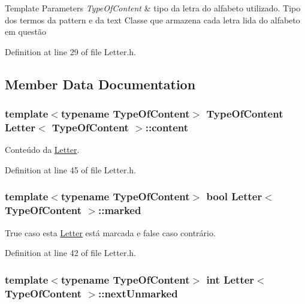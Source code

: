 \begin{DoxyTemplParams}{Template Parameters}
{\em Type\+Of\+Content} & tipo da letra do alfabeto utilizado. Tipo dos termos da pattern e da text Classe que armazena cada letra lida do alfabeto em questão \\
\hline
\end{DoxyTemplParams}


Definition at line 29 of file Letter.\+h.



\subsection{Member Data Documentation}
\hypertarget{classLetter_a9b3d3b6fe677bf9e96a034f71beda5c4}{
\subsubsection[{content}]{\setlength{\rightskip}{0pt plus 5cm}template$<$typename Type\+Of\+Content$>$ Type\+Of\+Content {\bf Letter}$<$ Type\+Of\+Content $>$\+::content}}\label{classLetter_a9b3d3b6fe677bf9e96a034f71beda5c4}


Conteúdo da \hyperlink{classLetter}{Letter}. 



Definition at line 45 of file Letter.\+h.

\hypertarget{classLetter_a720835d4e8e538b206ce5cb93da530a8}{
\subsubsection[{marked}]{\setlength{\rightskip}{0pt plus 5cm}template$<$typename Type\+Of\+Content$>$ bool {\bf Letter}$<$ Type\+Of\+Content $>$\+::marked}}\label{classLetter_a720835d4e8e538b206ce5cb93da530a8}


True caso esta \hyperlink{classLetter}{Letter} está marcada e false caso contrário. 



Definition at line 42 of file Letter.\+h.

\hypertarget{classLetter_a88ed419ad80a3c9e773f2c2dd0fafe97}{
\subsubsection[{next\+Unmarked}]{\setlength{\rightskip}{0pt plus 5cm}template$<$typename Type\+Of\+Content$>$ int {\bf Letter}$<$ Type\+Of\+Content $>$\+::next\+Unmarked}}\label{classLetter_a88ed419ad80a3c9e773f2c2dd0fafe97}


